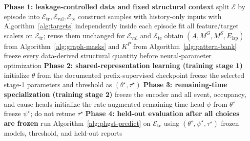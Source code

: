 \documentclass[a4paper,fleqn]{cas-dc}
\begin{document}
\begin{algorithm*}[t]
\SetAlFnt{\small}
\SetAlCapFnt{\small}
\SetAlCapNameFnt{\small\bfseries}
\SetInd{0.6em}{1.0em}
\caption{End-to-end PHGST-DM training, selection, and held-out evaluation.}
\label{alg:phgst-train}
\BlankLine
\textbf{Phase 1: leakage-controlled data and fixed structural context}\;
split $\mathcal{E}$ by episode into $\mathcal{E}_{\mathrm{tr}},\mathcal{E}_{\mathrm{val}},\mathcal{E}_{\mathrm{te}}$\;
construct samples with history-only inputs with Algorithm~\ref{alg:targets} independently inside each episode\;
fit all feature/target scalers on $\mathcal{E}_{\mathrm{tr}}$; reuse them unchanged for $\mathcal{E}_{\mathrm{val}}$ and $\mathcal{E}_{\mathrm{te}}$\;
obtain $(A,M^{G},M^{S},E_{\mathrm{lap}})$ from Algorithm~\ref{alg:graph-masks} and $K^{P}$ from Algorithm~\ref{alg:pattern-bank}\;
freeze every data-derived structural quantity before neural-parameter optimization 
\BlankLine
\textbf{Phase 2: shared-representation learning (training stage 1)}\;
initialize $\theta$ from the documented prefix-supervised checkpoint\;
freeze the selected stage-1 parameters and threshold as $(\theta^{\star},\tau^{\star})$ 
\BlankLine
\textbf{Phase 3: remaining-time specialization (training stage 2)}\;
freeze the encoder and all event, occupancy, and cause heads\;
initialize the rate-augmented remaining-time head $\psi$ from $\theta^{\star}$\;
freeze $\psi^{\star}$; do not retune $\tau^{\star}$\;
\BlankLine
\textbf{Phase 4: held-out evaluation after all choices are frozen}\;
run Algorithm~\ref{alg:phgst-predict} on $\mathcal{E}_{\mathrm{te}}$ using $(\theta^{\star},\psi^{\star},\tau^{\star})$\;
\Return frozen models, threshold, and held-out reports 
\end{algorithm*}
\end{document}
